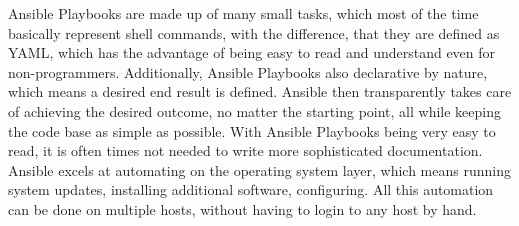 \noindent
Ansible Playbooks are made up of many small tasks, which most of the time basically
represent shell commands, with the difference, that they are defined as YAML,
which has the advantage of being easy to read and understand even for non-programmers.
Additionally, Ansible Playbooks also declarative by nature, which means a desired end result 
is defined. Ansible then transparently takes care of achieving the desired outcome,
no matter the starting point, all while keeping the code base as simple as possible.
With Ansible Playbooks being very easy to read, it is often times not needed to write 
more sophisticated documentation.
Ansible excels at automating on the operating system layer,
which means running system updates, installing additional software,
configuring. All this automation can be done on multiple hosts, without 
having to login to any host by hand. 





